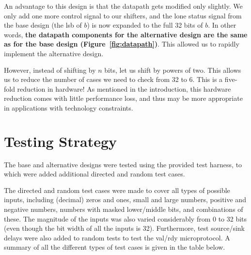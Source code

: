\documentclass[11pt]{article}
\begin{document}
An advantage to this design is that the datapath gets modified only slightly.
We only add one more control signal to our shifters, and the lone status signal from the base design (the lsb of $b$) is now expanded to the full 32 bits of $b$.
In other words, \textbf{the datapath components for the alternative design are the same as for the base design (Figure~\ref{fig:datapath})}. 
This allowed us to rapidly implement the alternative design.

However, instead of shifting by $n$ bits, let us shift by powers of two.
This allows us to reduce the number of cases we need to check from 32 to 6.
This is a five-fold reduction in hardware! As mentioned in the introduction, this hardware reduction comes with little performance loss, and thus may be more appropriate in applications with technology constraints. 


\section{Testing Strategy}

The base and alternative designs were tested using the provided test harness, to which were added additional directed and random test cases.

The directed and random test cases were made to cover all types of possible inputs, including (decimal) zeros and ones, small and large numbers, positive and negative numbers, numbers with masked lower/middle bits, and combinations of these. The magnitude of the inputs was also varied considerably from 0 to 32 bits (even though the bit width of all the inputs is 32). Furthermore, test source/sink delays were also added to random tests to test the val/rdy microprotocol. A summary of all the different types of test cases is given in the table below.
\end{document}
